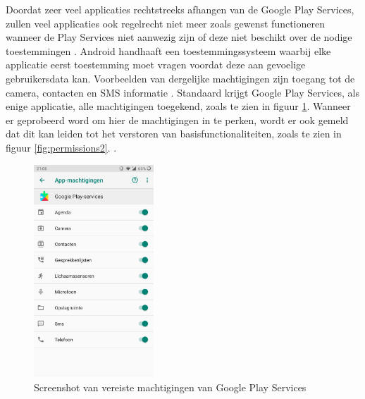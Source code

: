 Doordat zeer veel applicaties rechtstreeks afhangen van de Google Play Services, zullen veel applicaties ook regelrecht niet meer zoals gewenst functioneren wanneer de Play Services niet aanwezig zijn of deze niet beschikt over de nodige toestemmingen \autocite{marshall_google-play-services}. Android handhaaft een toestemmingssysteem waarbij elke applicatie eerst toestemming moet vragen voordat deze aan gevoelige gebruikersdata kan. Voorbeelden van dergelijke machtigingen zijn toegang tot de camera, contacten en SMS informatie \autocite{android_permissions}. Standaard krijgt Google Play Services, als enige applicatie, alle machtigingen toegekend, zoals te zien in figuur \ref{fig:permissions1}. Wanneer er geprobeerd word om hier de machtigingen in te perken, wordt er ook gemeld dat dit kan leiden tot het verstoren van basisfunctionaliteiten, zoals te zien in figuur \ref{fig:permissions2}. .

\begin{figure}
    \centering
    \includegraphics[width=0.4\textwidth]{img/machtigingen.jpg}
    \caption{Screenshot van vereiste machtigingen van Google Play Services}
    \label{fig:permissions1}
\end{figure}

